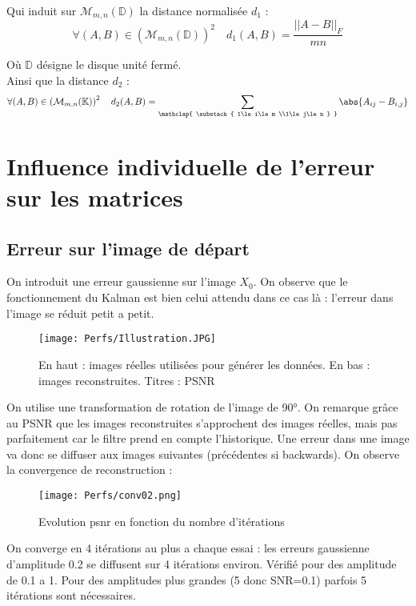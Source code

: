 \documentclass[titlepage]{article}
\newcommand{\fnorm}[1]{|\vert#1|\vert_{F}} %
\begin{document}
	Qui induit sur $\mathcal{M}_{m,n}(\mathbb{D})$ la distance normalisée $d_1$ :
	$$
		\forall(A,B)\in\left(\mathcal{M}_{m,n}(\mathbb{D})\right)^2\quad d_1(A,B) = \frac{\fnorm{A-B}}{mn}
	$$
	
	Où $\mathbb{D}$ désigne le disque unité fermé.\\
	
	Ainsi que la distance $d_2$ :
	$$
		\forall(A,B)\in\left(\mathcal{M}_{m,n}(\mathbb{K})\right)^2\quad d_2(A,B) = \sum_{
			\mathclap{
				\substack{
					1\le i\le m \\1\le j\le n
				}
			}
		}\abs{A_{ij} - B_{i,j}}
	$$
	
	\newpage
	\section{Influence individuelle de l'erreur sur les matrices}
	\subsection{Erreur sur l'image de départ}
	On introduit une erreur gaussienne sur l'image $X_0$. On observe que le fonctionnement du Kalman est bien celui attendu dans ce cas là : l'erreur dans l'image se réduit petit a petit.
	
	\begin{figure}[H]
		\centering
		\texttt{[image: Perfs/Illustration.JPG]}
		\caption{En haut : images réelles utilisées pour générer les données. En bas : images reconstruites. Titres : PSNR}
	\end{figure}

	On utilise une transformation de rotation de l'image de 90°. On remarque grâce au PSNR que les images reconstruites s'approchent des images réelles, mais pas parfaitement car le filtre prend en compte l'historique. Une erreur dans une image va donc se diffuser aux images suivantes (précédentes si backwards). On observe la convergence de reconstruction :
	
	\begin{figure}[H]
		\centering
		\texttt{[image: Perfs/conv02.png]}
		\caption{Evolution psnr en fonction du nombre d'itérations}
	\end{figure}

	On converge en 4 itérations au plus a chaque essai : les erreurs gaussienne d'amplitude 0.2 se diffusent sur 4 itérations environ.
	Vérifié pour des amplitude de 0.1 a 1. Pour des amplitudes plus grandes (5 donc SNR=0.1) parfois 5 itérations sont nécessaires.
	
\end{document}
